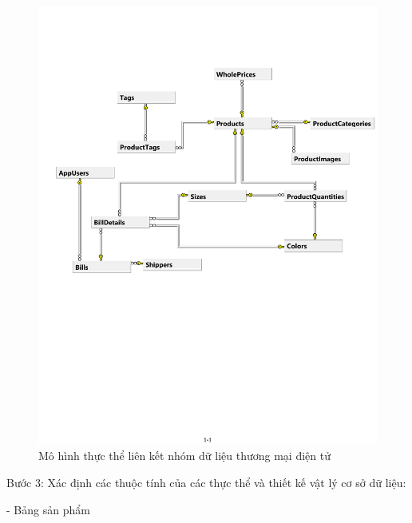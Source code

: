 \begin{center}
    \begin{figure}[h]
    \begin{center}
     \includegraphics[scale=0.7]{image/E-REcomerce.pdf}
    \end{center}
    \caption{Mô hình thực thể liên kết nhóm dữ liệu thương mại điện tử}
    \label{refhinh3_12}
    \end{figure}
\end{center}
\newpage
Bước 3: Xác định các thuộc tính của các thực thể và thiết kế vật lý cơ sở dữ liệu:
\par
- Bảng sản phẩm
